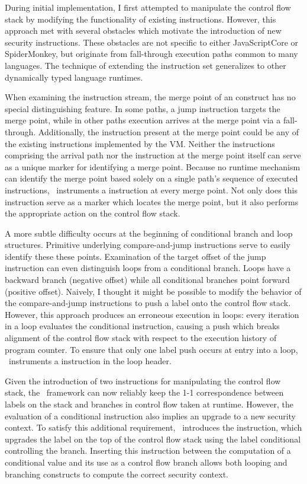 During initial implementation, I first attempted to manipulate the control flow stack by modifying the functionality of existing instructions.
However, this approach met with several obstacles which motivate the introduction of new security instructions.
These obstacles are not specific to either JavaScriptCore or SpiderMonkey, but originate from fall-through execution paths common to many languages.
The technique of extending the instruction set generalizes to other dynamically typed language runtimes.

When examining the instruction stream, the merge point of an  construct has no special distinguishing feature.
In some paths, a jump instruction targets the merge point, while in other paths execution arrives at the merge point via a fall-through.
Additionally, the instruction present at the merge point could be any of the existing instructions implemented by the VM.
Neither the instructions comprising the arrival path nor the instruction at the merge point itself can serve as a unique marker for identifying a merge point.
Because no runtime mechanism can identify the merge point based solely on a single path's sequence of executed instructions, \FlowCore\ instruments a \popj instruction at every merge point.
Not only does this instruction serve as a marker which locates the merge point, but it also performs the appropriate action on the control flow stack.

A more subtle difficulty occurs at the beginning of conditional branch and loop structures.
Primitive underlying compare-and-jump instructions serve to easily identify these these points.
Examination of the target offset of the jump instruction can even distinguish loops from a conditional branch.
Loops have a backward branch (negative offset) while all conditional branches point forward (positive offset).
Naively, I thought it might be possible to modify the behavior of the compare-and-jump instructions to push a label onto the control flow stack.
However, this approach produces an erroneous execution in loops: every iteration in a loop evaluates the conditional instruction, causing a push which breaks alignment of the control flow stack with respect to the execution history of program counter.
To ensure that only one label push occurs at entry into a loop, \FlowCore\ instruments a \dup instruction in the loop header.

Given the introduction of two instructions for manipulating the control flow stack, the \FlowCore\ framework can now reliably keep the 1-1 correspondence between labels on the stack and branches in control flow taken at runtime.
However, the evaluation of a conditional instruction also implies an upgrade to a new security context.
To satisfy this additional requirement, \FlowCore\ introduces the \join instruction, which upgrades the label on the top of the control flow stack using the label conditional controlling the branch.
Inserting this instruction between the computation of a conditional value and its use as a control flow branch allows both looping and branching constructs to compute the correct security context.

